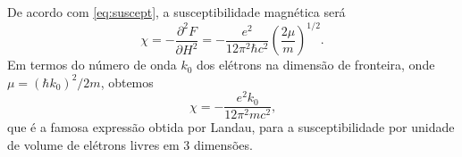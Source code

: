 \documentclass{article}
\begin{document}
De acordo com \eqref{eq:suscept}, a susceptibilidade magnética será
\begin{equation}
 \chi = - \frac{\partial^2 F}{\partial H^2} = - \frac{e^2}{12 \pi^2 \hbar c^2}
 \left( \frac{2 \mu}{m}\right)^{1\slash 2}\text{.}
\end{equation}
Em termos do número de onda $k_0$ dos elétrons na dimensão de fronteira, onde $\mu = (\hbar k_0)^2 \slash 2m$, obtemos
\begin{equation}
 \chi = -\frac{e^2 k_0}{12 \pi^2 m c^2}\text{,}
\end{equation}
que é a famosa expressão obtida por Landau, para a susceptibilidade por unidade de volume de elétrons livres em $3$
dimensões.
\end{document}
